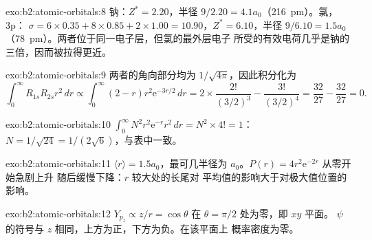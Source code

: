 \begin{solution}{exo:b2:atomic-orbitals:8}
钠：$Z^* = 2.20$，半径 $9/2.20 = 4.1a_0$（\qty{216}{pm}）。氯，3p：
$\sigma = 6 \times 0.35 + 8 \times 0.85 + 2 \times 1.00 = 10.90$，$Z^* = 6.10$，半径
$9/6.10 = 1.5a_0$（\qty{78}{pm}）。两者位于同一电子层，但氯的最外层电子
所受的有效电荷几乎是钠的三倍，因而被拉得更近。
\end{solution}

\begin{solution}{exo:b2:atomic-orbitals:9}
两者的角向部分均为 $1/\sqrt{4\pi}$，因此积分化为
\[
  \int_0^\infty R_{1s}R_{2s}r^2\,dr \propto \int_0^\infty (2 - r)r^2\mathrm e^{-3r/2}\,dr =
  2 \times \frac{2!}{(3/2)^3} - \frac{3!}{(3/2)^4} = \frac{32}{27} - \frac{32}{27} = 0 .
\]
\end{solution}

\begin{solution}{exo:b2:atomic-orbitals:10}
$\int_0^\infty N^2r^2\mathrm e^{-r}r^2\,dr = N^2 \times 4! = 1$：$N = 1/\sqrt{24} =
1/(2\sqrt6)$，与表中一致。
\end{solution}

\begin{solution}{exo:b2:atomic-orbitals:11}
$\langle r\rangle = 1.5a_0$，最可几半径为 $a_0$。$P(r) = 4r^2\mathrm e^{-2r}$ 从零开始急剧上升
随后缓慢下降：$r$ 较大处的长尾对
平均值的影响大于对极大值位置的影响。
\end{solution}

\begin{solution}{exo:b2:atomic-orbitals:12}
$Y_{p_z} \propto z/r = \cos\theta$ 在 $\theta = \pi/2$ 处为零，即 $xy$ 平面。
$\psi$ 的符号与 $z$ 相同，上方为正，下方为负。在该平面上
概率密度为零。
\end{solution}

